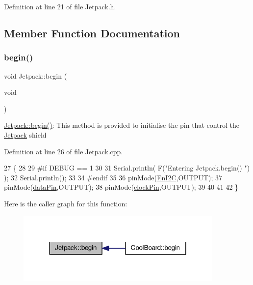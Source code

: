 Definition at line 21 of file Jetpack.\+h.



\subsection{Member Function Documentation}
\mbox{\label{class_jetpack_a5a53e1ebf7aaf3bf3e0d37ea64ca09a7}} 
\subsubsection{\texorpdfstring{begin()}{begin()}}
{\footnotesize\ttfamily void Jetpack\+::begin (\begin{DoxyParamCaption}\item[{void}]{ }\end{DoxyParamCaption})}

\hyperlink{class_jetpack_a5a53e1ebf7aaf3bf3e0d37ea64ca09a7}{Jetpack\+::begin()}\+: This method is provided to initialise the pin that control the \hyperlink{class_jetpack}{Jetpack} shield 

Definition at line 26 of file Jetpack.\+cpp.


\begin{DoxyCode}
27 \{
28 
29 \textcolor{preprocessor}{#if DEBUG == 1 }
30  
31     Serial.println( F(\textcolor{stringliteral}{"Entering Jetpack.begin() "}) );
32     Serial.println();
33 
34 \textcolor{preprocessor}{#endif}
35 
36     pinMode(\hyperlink{class_jetpack_a81df984fb4cea98c71aa1a1cfcdfe814}{EnI2C},OUTPUT);
37     pinMode(\hyperlink{class_jetpack_a3d669a56e93c71dd25f970d4ed7d0c00}{dataPin},OUTPUT);
38     pinMode(\hyperlink{class_jetpack_a58ebb991f358f3ae94e82148b0221b5a}{clockPin},OUTPUT);
39     
40     
41 
42 \}
\end{DoxyCode}
Here is the caller graph for this function\+:\nopagebreak
\begin{figure}[H]
\begin{center}
\leavevmode
\includegraphics[width=288pt]{df/d1d/class_jetpack_a5a53e1ebf7aaf3bf3e0d37ea64ca09a7_icgraph}
\end{center}
\end{figure}
\mbox{\label{class_jetpack_ab065ee83e244265a2223a22f3ee4a719}} 
